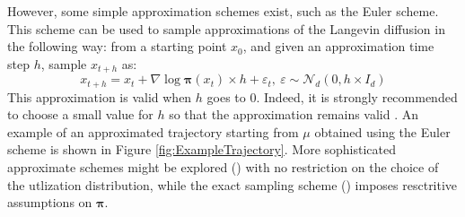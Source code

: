 \documentclass[10pt,a4paper, draft]{article}
\newcommand{\ud}{\boldsymbol{\pi}}
\begin{document}
However, some simple approximation schemes exist, such as the Euler scheme. This scheme can be used to sample approximations of the Langevin diffusion in the following way: from a starting point $x_0$, and given an approximation time step $h$, sample $x_{t+h}$ as:
\begin{equation}
\label{eq:EulerScheme}
x_{t+h} = x_t + \nabla \log \ud(x_t)\times h +\varepsilon_t,~\varepsilon \sim \mathcal{N}_d\left(0, h\times I_d\right)
\end{equation} 
This approximation is valid  when $h$ goes to 0. Indeed, it is strongly recommended to choose a small value for $h$ so that the approximation remains valid \citep{roberts1996exponential}.
An example of an approximated trajectory starting from $\mu$ obtained using the Euler scheme is shown in Figure \ref{fig:ExampleTrajectory}. More sophisticated approximate schemes might be explored (\citealp{gloaguen2017stochastic}) with no restriction on the choice of the utlization distribution, while the exact sampling scheme (\citealp{beskos2006exact}) imposes resctritive assumptions on $\mathbf{\pi}$.
\end{document}
